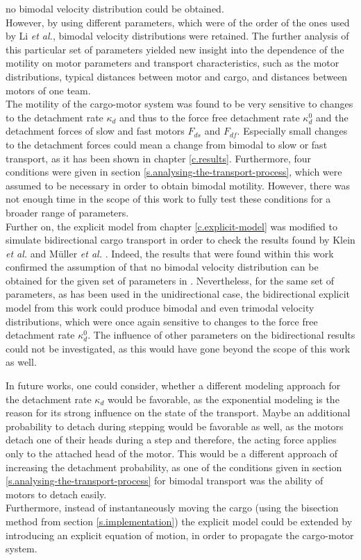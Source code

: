 no bimodal velocity distribution could be obtained. \\
However, by using different parameters, which were of the order of the ones used by Li \textit{et al.}, bimodal velocity distributions were retained. The further analysis of this 
particular set of parameters yielded new insight into the dependence of the motility on motor parameters and transport characteristics, such as the motor distributions, typical distances between
motor and cargo, and distances between motors of one team. \\
The motility of the cargo-motor system was found to be very sensitive to changes to the detachment rate $\kappa_d$ and thus to the force free detachment rate $\kappa_d^0$ and the 
detachment forces of slow and fast motors $F_{ds}$ and $F_{df}$. Especially small changes to the detachment forces could mean a change from bimodal to slow or fast transport, as it has
been shown in chapter \ref{c.results}. Furthermore, four conditions were given in section \ref{s.analysing-the-transport-process}, which were assumed to be necessary in order to obtain
bimodal motility. However, there was not enough time in the scope of this work to fully test these conditions for a broader range of parameters. \\
Further on, the explicit model from chapter \ref{c.explicit-model} was modified to simulate bidirectional cargo transport in order to check the results found by Klein \textit{et al.}
\cite{sklein} and Müller \textit{et al.} \cite{pnas105}. Indeed, the results that were found within this work confirmed the assumption of \cite{sklein} that no bimodal velocity distribution
can be obtained for the given set of parameters in \cite{pnas105}. Nevertheless, for the same set of parameters, as has been used in the unidirectional case, the bidirectional explicit model
from this work could produce bimodal and even trimodal velocity distributions, which were once again sensitive to changes to the force free detachment rate $\kappa_d^0$. The influence of other
parameters on the bidirectional results could not be investigated, as this would have gone beyond the scope of this work as well.

In future works, one could consider, whether a different modeling approach for the detachment rate $\kappa_d$ would be favorable, as the exponential modeling is the reason for its strong influence
on the state of the transport. Maybe an additional probability to detach during stepping would be favorable as well, as the motors detach one of their heads during a step and therefore, the
acting force applies only to the attached head of the motor. This would be a different approach of increasing the detachment probability, as one of the conditions given in section
\ref{s.analysing-the-transport-process} for bimodal transport was the ability of motors to detach easily.\\
Furthermore, instead of instantaneously moving the cargo (using the bisection method from section \ref{s.implementation}) the explicit model could be extended by introducing an explicit
equation of motion, in order to propagate the cargo-motor system.


